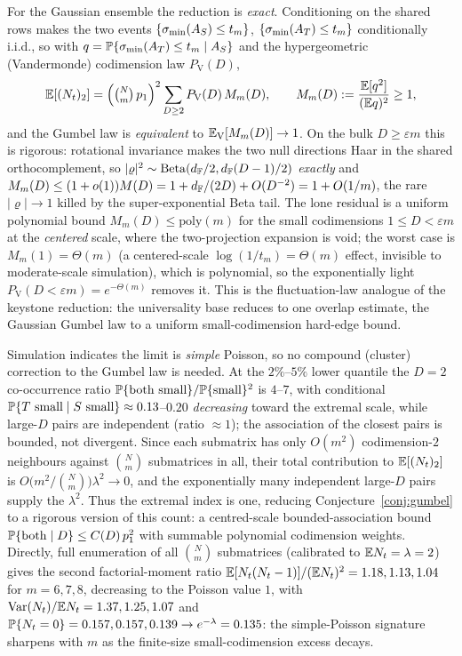 For the Gaussian ensemble the reduction is \emph{exact}.  Conditioning on the shared rows makes the two
events $\{\sigma_{\min}(A_S)\le t_m\}$, $\{\sigma_{\min}(A_T)\le t_m\}$ conditionally i.i.d., so with
\(q=\mathbb{P}\{\sigma_{\min}(A_T)\le t_m\mid A_S\}\) and the hypergeometric (Vandermonde) codimension law \(P_{\mathrm V}(D)\),
\[
  \mathbb{E}[(N_t)_2]=\Big(\tbinom Nm\,p_1\Big)^2\sum_{D\ge2}P_{\mathrm V}(D)\,M_m(D),\qquad
  M_m(D):=\frac{\mathbb{E}[q^2]}{(\mathbb{E} q)^2}\ge1,
\]
and the Gumbel law is \emph{equivalent} to \(\mathbb{E}_{\mathrm V}[M_m(D)]\to1\).  On the bulk \(D\ge\varepsilon m\)
this is rigorous: rotational invariance makes the two null directions Haar in the shared orthocomplement,
so \(|\varrho|^2\sim\operatorname{Beta}(d_{\mathbb{F}}/2,d_{\mathbb{F}}(D-1)/2)\) \emph{exactly} and
\(M_m(D)\le(1+o(1))M(D)=1+d_{\mathbb{F}}/(2D)+O(D^{-2})=1+O(1/m)\), the rare \(|\varrho|\to1\) killed by the
super-exponential Beta tail.  The lone residual is a uniform polynomial bound \(M_m(D)\le\mathrm{poly}(m)\)
for the small codimensions \(1\le D<\varepsilon m\) at the \emph{centered} scale, where the two-projection
expansion is void; the worst case is \(M_m(1)=\Theta(m)\) (a centered-scale \(\log(1/t_m)=\Theta(m)\)
effect, invisible to moderate-scale simulation), which is polynomial, so the exponentially light
\(P_{\mathrm V}(D<\varepsilon m)=e^{-\Theta(m)}\) removes it.  This is the fluctuation-law analogue of the
keystone reduction: the universality base reduces to one overlap estimate, the Gaussian Gumbel law to a
uniform small-codimension hard-edge bound.

Simulation indicates the limit is \emph{simple} Poisson, so no compound (cluster)
correction to the Gumbel law is needed.  At the \(2\%\)--\(5\%\) lower quantile the
\(D=2\) co-occurrence ratio \(\mathbb{P}\{\text{both small}\}/\mathbb{P}\{\text{small}\}^2\) is
\(4\)--\(7\), with conditional \(\mathbb{P}\{T\text{ small}\mid S\text{ small}\}\approx0.13\)--\(0.20\)
\emph{decreasing} toward the extremal scale, while large-\(D\) pairs are independent
(ratio \(\approx1\)); the association of the closest pairs is bounded, not divergent.
Since each submatrix has only \(O(m^2)\) codimension-\(2\) neighbours against
\(\binom{N}{m}\) submatrices in all, their total contribution to \(\mathbb{E}[(N_t)_2]\) is
\(O\!\big(m^2/\binom{N}{m}\big)\lambda^2\to0\), and the exponentially many independent
large-\(D\) pairs supply the \(\lambda^2\).  Thus the extremal index is one, reducing
Conjecture~\ref{conj:gumbel} to a rigorous version of this count: a centred-scale
bounded-association bound \(\mathbb{P}\{\text{both}\mid D\}\le C(D)\,p_1^2\) with summable
polynomial codimension weights.  Directly, full enumeration of all \(\binom{N}{m}\)
submatrices (calibrated to \(\mathbb{E} N_t=\lambda=2\)) gives the second factorial-moment
ratio \(\mathbb{E}[N_t(N_t-1)]/(\mathbb{E} N_t)^2=1.18,1.13,1.04\) for \(m=6,7,8\), decreasing to
the Poisson value \(1\), with \(\operatorname{Var}(N_t)/\mathbb{E} N_t=1.37,1.25,1.07\) and
\(\mathbb{P}\{N_t=0\}=0.157,0.157,0.139\to e^{-\lambda}=0.135\): the simple-Poisson signature
sharpens with \(m\) as the finite-size small-codimension excess decays.

